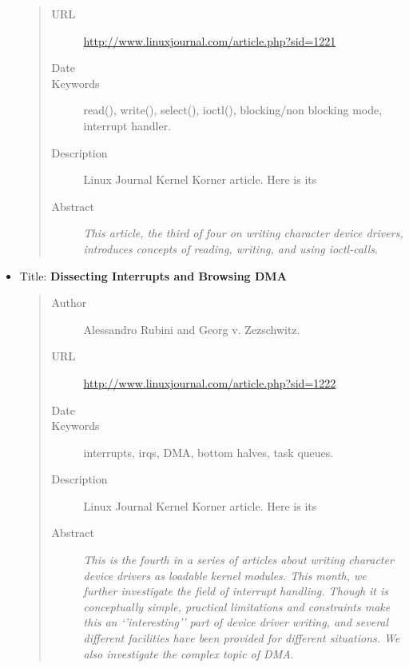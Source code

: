 \documentclass[a4paper,8pt,english]{sphinxmanual}
\begin{document}
\begin{itemize}
\begin{quote}
\begin{description}
\item[{URL}] \leavevmode
\href{http://www.linuxjournal.com/article.php?sid=1221}{http://www.linuxjournal.com/article.php?sid=1221}

\item[{Date}] 

\item[{Keywords}] \leavevmode
read(), write(), select(), ioctl(), blocking/non
blocking mode, interrupt handler.

\item[{Description}] \leavevmode
Linux Journal Kernel Korner article. Here is its

\item[{Abstract}] \leavevmode
\emph{This article, the third of four on writing character
device drivers, introduces concepts of reading, writing, and using
ioctl-calls}.

\end{description}\end{quote}

\item {} 
Title: \textbf{Dissecting Interrupts and Browsing DMA}
\begin{quote}\begin{description}
\item[{Author}] \leavevmode
Alessandro Rubini and Georg v. Zezschwitz.

\item[{URL}] \leavevmode
\href{http://www.linuxjournal.com/article.php?sid=1222}{http://www.linuxjournal.com/article.php?sid=1222}

\item[{Date}] 

\item[{Keywords}] \leavevmode
interrupts, irqs, DMA, bottom halves, task queues.

\item[{Description}] \leavevmode
Linux Journal Kernel Korner article. Here is its

\item[{Abstract}] \leavevmode
\emph{This is the fourth in a series of articles about
writing character device drivers as loadable kernel modules. This
month, we further investigate the field of interrupt handling.
Though it is conceptually simple, practical limitations and
constraints make this an `'interesting'' part of device driver
writing, and several different facilities have been provided for
different situations. We also investigate the complex topic of
DMA}.


\end{description}
\end{quote}
\end{itemize}
\end{document}
